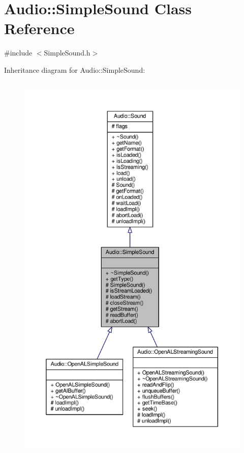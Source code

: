 \hypertarget{classAudio_1_1SimpleSound}{}\section{Audio\+:\+:Simple\+Sound Class Reference}
\label{classAudio_1_1SimpleSound}


{\ttfamily \#include $<$Simple\+Sound.\+h$>$}



Inheritance diagram for Audio\+:\+:Simple\+Sound\+:
\nopagebreak
\begin{figure}[H]
\begin{center}
\leavevmode
\includegraphics[height=550pt]{da/d2c/classAudio_1_1SimpleSound__inherit__graph}
\end{center}
\end{figure}


